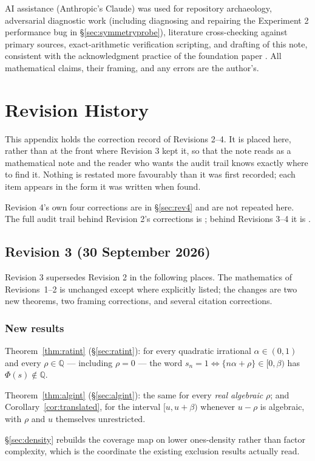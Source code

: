 \documentclass[11pt]{article}
\newcommand{\Q}{\mathbb{Q}}
\begin{document}
AI assistance (Anthropic's Claude) was used for repository archaeology, adversarial diagnostic work (including diagnosing and repairing the Experiment 2 performance bug in \S\ref{sec:symmetryprobe}), literature cross-checking against primary sources, exact-arithmetic verification scripting, and drafting of this note, consistent with the acknowledgment practice of the foundation paper \cite{DeJesus2026Sturmian}. All mathematical claims, their framing, and any errors are the author's.

\appendix

\section{Revision History}
\label{app:history}

This appendix holds the correction record of Revisions 2--4. It is placed here, rather than at the
front where Revision 3 kept it, so that the note reads as a mathematical note and the reader who wants
the audit trail knows exactly where to find it. Nothing is restated more favourably than it was first
recorded; each item appears in the form it was written when found.

Revision 4's own four corrections are in \S\ref{sec:rev4} and are not repeated here. The full audit
trail behind Revision 2's corrections is \cite{Phase8Target,Phase8Verdict}; behind Revisions 3--4 it is
\cite{Phase12Quad,Phase13Alg,Phase14Constants}.

\subsection{Revision 3 (30 September 2026)}
\label{sec:rev3}

Revision 3 supersedes Revision 2 in the following places. The mathematics of Revisions~1--2
is unchanged except where explicitly listed; the changes are two new theorems, two framing
corrections, and several citation corrections.

\subsubsection*{New results}

\begin{description}[leftmargin=2.5em,style=nextline]
\item[N1 --- Critical-density rotation codings, rational intercept.]
Theorem~\ref{thm:ratint} (\S\ref{sec:ratint}): for every quadratic irrational $\alpha\in(0,1)$ and
every $\rho\in\Q$ --- including $\rho=0$ --- the word $s_n=1\iff\{n\alpha+\rho\}\in[0,\beta)$ has
$\Phi(s)\notin\Q$.
\item[N2 --- Algebraic intercepts.]
Theorem~\ref{thm:algint} (\S\ref{sec:algint}): the same for every \emph{real algebraic} $\rho$; and
Corollary~\ref{cor:translated}, for the interval $[u,u+\beta)$ whenever $u-\rho$ is algebraic, with
$\rho$ and $u$ themselves unrestricted.
\item[N3 --- Where the residual case is.]
\S\ref{sec:density} rebuilds the coverage map on lower ones-density rather than factor complexity,
which is the coordinate the existing exclusion results actually read.
\end{description}
\end{document}
